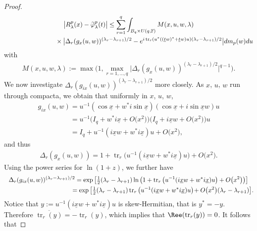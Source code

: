 \begin{proof}
\begin{gather}
\big|R_{\lambda}^p(x)-\widetilde\varphi_\lambda^{p}(t)\big| \leq \sum\limits_{r=1}^q \int_{B_q\times U(q,\mathbb F)}
M(x,u,w,\lambda)
\label{main-estimate}
\\
\hphantom{\big|R_{\lambda}^p(x)-\widetilde\varphi_\lambda^{p}(t)\big| \leq}{}
\times \big| \Delta_r(g_{x}(u,w))^{(\lambda_r-\lambda_{r+1})/2}
 - e^{i \operatorname{tr}_r(u^*((\underline tw)^*+ \underline tw)u)  (\lambda_r-\lambda_{r+1})/2}\big| dm_p(w)du
\nonumber
\end{gather}
with
\begin{gather*}
M(x,u,w,\lambda):=\max \Big(1, \max_{r=1,\ldots,q}\big|\Delta_r(g_{x}(u,w))^{(\lambda_r-\lambda_{r+1})/2}\big|^{q-1}\Big).
\end{gather*}
We now investigate $\Delta_r(g_{ix}(u,w))^{(\lambda_r-\lambda_{r+1})/2}$ more closely.
As $x$, $u$, $w$ run through compacta, we obtain that uniformly in $x$, $u$, $w$,
\begin{gather*}
g_{ix}(u,w)=u^{-1}(\cos\underline x+w^*i \sin \underline x)(\cos\underline x+i\sin \underline x w)u
\\
\phantom{g_{ix}(u,w)}
=u^{-1}\big(I_q+ w^*i\underline x+O\big(x^2\big)\big) \big(I_q+i \underline x w+O\big(x^2\big)\big)u
\\
\phantom{g_{ix}(u,w)}
=I_q+ u^{-1}(i\underline x w+w^*i\underline x)u +O\big(x^2\big),
\end{gather*}
and thus
\begin{gather}
\label{entwickel}
\Delta_r(g_{x}(u,w))= 1+ \operatorname{tr}_r\big(u^{-1}(i\underline xw+w^*i\underline x)u\big)+O\big(x^2\big).
\end{gather}
Using the power series for $\ln(1+z)$, we further have
\begin{gather*}
\Delta_r(g_{ix}(u,w) )^{(\lambda_r-\lambda_{r+1})/2}=\exp\big[\tfrac 12 (\lambda_r-\lambda_{r+1})  \ln\big(1+
\operatorname{tr}_r\big(u^{-1}(i\underline xw+w^*i\underline x)u\big) +O\big(x^2\big)\big)\big]
\\
\hphantom{\Delta_r(g_{ix}(u,w) )^{(\lambda_r-\lambda_{r+1})/2}}{}
 =\exp\big[\tfrac 12(\lambda_r-\lambda_{r+1})  \operatorname{tr}_r\big(u^{-1}(i\underline xw+w^*i\underline x)u\big)\!+O\big(x^2\big) (\lambda_r-\lambda_{r+1})\big].\!
\end{gather*}
Notice that $y:= u^{-1}(i\underline xw+w^*i\underline x)u $ is skew-Hermitian, that is $y^*=-y$.
Therefore $\overline {\operatorname{tr}_r(y)}=- \operatorname{tr}_r(y)$, which implies that $\Ree(\operatorname{tr}_r(y))=0$. It follows that

\end{proof}

